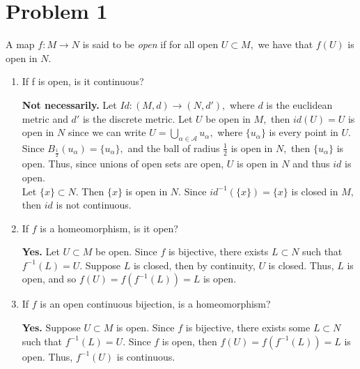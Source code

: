 \documentclass[11pt]{article}
\begin{document}
	
	
	\psetheader

\section*{Problem 1}
\begin{problem}
    A map $f: M \to N$ is said to be \textit{open} if for all open $U\subset M,$ we have that $f(U)$ is open in $N.$
\end{problem}
\begin{enumerate}
    \item  
    \begin{problem}
        If f is open, is it continuous?
    \end{problem}
    \begin{solution}
        \textbf{Not necessarily.} Let $Id:(M,d)\to (N,d'),$ where $d$ is the euclidean metric and $d'$ is the discrete metric. Let $U$ be open in $M,$ then $id(U) = U$ is open in $N$ since we can write $U= \displaystyle\bigcup_{\alpha\in \mathscr{A}}u_\alpha,$ where $\{u_\alpha\}$ is every point in $U.$ Since $B_{\frac{1}{2}}(u_\alpha) = \{u_\alpha\},$ and the ball of radius $\frac{1}{2}$ is open in $N,$ then $\{u_\alpha\}$ is open. Thus, since unions of open sets are open, $U$ is open in $N$ and thus $id$ is open.\\
        Let $\{x\}\subset N.$ Then $\{x\}$ is open in $N.$ Since $id^{-1}(\{x\}) = \{x\}$ is closed in $M,$ then $id$ is not continuous.
    \end{solution}
    \item 
    \begin{problem}
        If $f$ is a homeomorphism, is it open?
    \end{problem}
    \begin{solution}
        \textbf{Yes.} Let $U\subset M$ be open. Since $f$ is bijective, there exists $L\subset N$ such that $f^{-1}(L) = U.$ Suppose $L$ is closed, then by continuity, $U$ is closed. Thus, $L$ is open, and so $f(U) = f(f^{-1}(L)) = L$ is open.
    \end{solution}
    \item
    \begin{problem}
        If $f$ is an open continuous bijection, is a homeomorphism?
    \end{problem}
    \begin{solution}
        \textbf{Yes.} Suppose $U\subset M$ is open. Since $f$ is bijective, there exists some $L\subset N$ such that $f^{-1}(L) = U.$ Since $f$ is open, then $f(U) = f(f^{-1}(L)) = L$ is open. Thus, $f^{-1}(U)$ is continuous.

\end{solution}
\end{enumerate}
\end{document}
